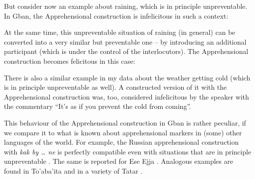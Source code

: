 \documentclass[output=paper,colorlinks,citecolor=brown
]{langscibook}
\begin{document}
But consider now an example about raining, which is in principle unpreventable. In Gban, the Apprehensional construction is infelicitous in such a context:

\z

 At the same time, this unpreventable situation of raining (in general) can be converted into a very similar but preventable one -- by introducing an additional participant (which is under the control of the interlocutors). The Apprehensional construction becomes felicitous in this case:

\z

There is also a similar example in my data about the weather getting cold (which is in principle unpreventable as well). A constructed version of it with the Apprehensional construction was, too, considered infelicitous by the speaker with the commentary ``It's as if you prevent the cold from coming''.

This behaviour of the Apprehensional construction in Gban is rather peculiar, if we compare it to what is known about apprehensional markers in (some) other languages of the world. For example, the Russian apprehensional construction with \textit{kak by {\dots} ne} is perfectly compatible even with situations that are in principle unpreventable . The same is reported for Ese Ejja \citep[274]{vuillermet2018}. Analogous examples are found in To'aba'ita  and in a variety of Tatar .
\end{document}
